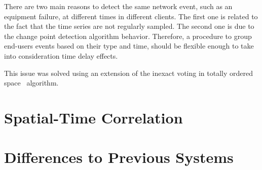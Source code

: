 There are two main reasons to detect the same network event, such as an
equipment failure, at different times in different clients. The first one is
related to the fact that the time series are not regularly sampled. The second
one is due to the change point detection algorithm behavior.
Therefore, a procedure to group end-users events based on their type and time,
should be flexible enough to take into consideration time delay effects.

This issue was solved using an extension of the inexact voting in totally
ordered space~\cite{voting_algorithms} algorithm.


\section{Spatial-Time Correlation}
\label{sec:spatial_time_correlation}

\section{Differences to Previous Systems}
